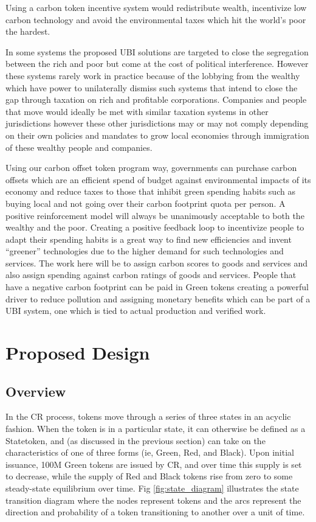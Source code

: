 \documentclass{article}
\begin{document}
Using a carbon token incentive system would redistribute wealth, incentivize low carbon
technology and avoid the environmental taxes which hit the world’s poor the hardest.

In some systems the proposed UBI solutions are targeted to close the segregation between
the rich and poor but come at the cost of political interference. However these systems
rarely work in practice because of the lobbying from the wealthy which have power to
unilaterally dismiss such systems that intend to close the gap through taxation on rich and
profitable corporations. Companies and people that move would ideally be met with similar
taxation systems in other jurisdictions however these other jurisdictions may or may not
comply depending on their own policies and mandates to grow local economies through
immigration of these wealthy people and companies.

Using our carbon offset token program way, governments can purchase carbon offsets
which are an efficient spend of budget against environmental impacts of its economy and
reduce taxes to those that inhibit green spending habits such as buying local and not going
over their carbon footprint quota per person. A positive reinforcement model will always be
unanimously acceptable to both the wealthy and the poor. Creating a positive feedback loop
to incentivize people to adapt their spending habits is a great way to find new efficiencies
and invent “greener” technologies due to the higher demand for such technologies and
services. The work here will be to assign carbon scores to goods and services and also
assign spending against carbon ratings of goods and services. People that have a negative
carbon footprint can be paid in Green tokens creating a powerful driver to reduce pollution
and assigning monetary benefits which can be part of a UBI system, one which is tied to
actual production and verified work.

\section{Proposed Design}

\subsection{Overview}

In the CR process, tokens move through a series of three states in an acyclic fashion. When the token is in a particular state, it can otherwise be defined as a Statetoken, and (as discussed in the previous section) can take on the characteristics of one of three forms (ie, Green, Red, and Black). Upon initial issuance, 100M Green tokens are issued by CR, and over time this supply is set to decrease, while the supply of Red and Black tokens rise from zero to some steady-state equilibrium over time. Fig \ref{fig:state_diagram} illustrates the state transition diagram where the nodes represent tokens and the arcs represent the direction and probability of a token transitioning to another over a unit of time.
\end{document}
